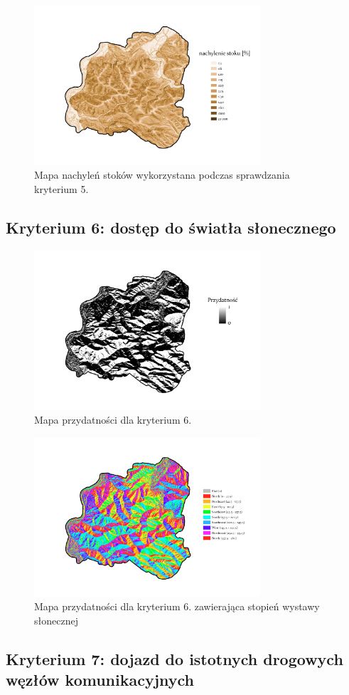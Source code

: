 \documentclass{article}
\begin{document}
\begin{figure}[H]
    \centering
    \includegraphics[width=0.75\textwidth]{img/plesna-kryterium5-stoki.jpg}
    \caption*{Mapa nachyleń stoków wykorzystana podczas sprawdzania kryterium 5.}
\end{figure}


\subsection{Kryterium 6: dostęp do światła słonecznego}
\begin{figure}[H]
    \centering
    \includegraphics[width=0.75\textwidth]{img/plesna-kryterium6-layout.jpg}
    \caption*{Mapa przydatności dla kryterium 6.}
\end{figure}

\begin{figure}[H]
    \centering
    \includegraphics[width=0.75\textwidth]{img/plesna-kryterium6-aspect.jpg}
    \caption*{Mapa przydatności dla kryterium 6. zawierająca stopień wystawy słonecznej}
\end{figure}

\subsection{Kryterium 7: dojazd do istotnych drogowych węzłów komunikacyjnych}
\end{document}
